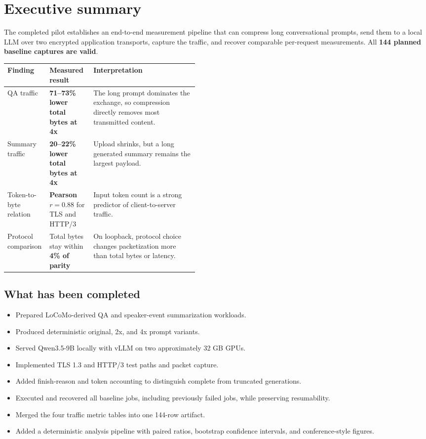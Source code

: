 \documentclass[10pt]{article}
\newcommand{\good}[1]{\textcolor{ReportGreen}{\bfseries #1}}
\newcommand{\key}[1]{\textcolor{ReportBlue}{\bfseries #1}}
\newcommand{\caution}[1]{\textcolor{ReportOrange}{\bfseries #1}}
\begin{document}
\section{Executive summary}

The completed pilot establishes an end-to-end measurement pipeline that can
compress long conversational prompts, send them to a local LLM over two
encrypted application transports, capture the traffic, and recover comparable
per-request measurements. All \textbf{144 planned baseline captures are valid}.

\begin{center}
\renewcommand{\arraystretch}{1.35}
\begin{tabularx}{\linewidth}{@{}p{0.22\linewidth}p{0.23\linewidth}Y@{}}
\toprule
\textbf{Finding} & \textbf{Measured result} & \textbf{Interpretation} \\
\midrule
QA traffic & \good{71--73\% lower total bytes at 4x} &
The long prompt dominates the exchange, so compression directly removes most
transmitted content. \\
Summary traffic & \caution{20--22\% lower total bytes at 4x} &
Upload shrinks, but a long generated summary remains the largest payload. \\
Token-to-byte relation & \key{Pearson $r=0.88$} for TLS and HTTP/3 &
Input token count is a strong predictor of client-to-server traffic. \\
Protocol comparison & Total bytes stay within \key{4\% of parity} &
On loopback, protocol choice changes packetization more than total bytes or
latency. \\
\bottomrule
\end{tabularx}
\end{center}

\subsection{What has been completed}

\begin{itemize}
  \item Prepared LoCoMo-derived QA and speaker-event summarization workloads.
  \item Produced deterministic original, 2x, and 4x prompt variants.
  \item Served Qwen3.5-9B locally with vLLM on two approximately 32 GB GPUs.
  \item Implemented TLS 1.3 and HTTP/3 test paths and packet capture.
  \item Added finish-reason and token accounting to distinguish complete from
        truncated generations.
  \item Executed and recovered all baseline jobs, including previously failed
        jobs, while preserving resumability.
  \item Merged the four traffic metric tables into one 144-row artifact.
  \item Added a deterministic analysis pipeline with paired ratios, bootstrap
        confidence intervals, and conference-style figures.
\end{itemize}
\end{document}
